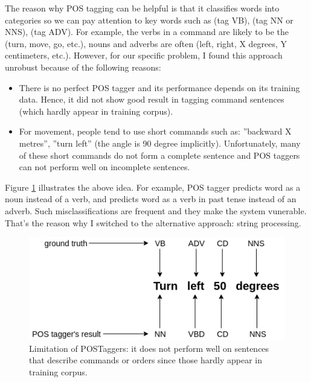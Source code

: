 The reason why POS tagging can be helpful is that it classifies words into categories so we can pay attention to key words such as  (tag VB),  (tag NN or NNS),  (tag ADV). For example, the verbs in a command are likely to be the  (turn, move, go, etc.), nouns and adverbs are often  (left, right, X degrees, Y centimeters, etc.). However, for our specific problem, I found this approach unrobust because of the following reasons:
\begin{itemize}
	\item There is no perfect POS tagger and its performance depends on its training data. Hence, it did not show good result in tagging command sentences (which hardly appear in training corpus).
	\item For movement, people tend to use short commands such as: ”backward X metres”, ”turn left” (the angle is 90 degree implicitly). Unfortunately, many of these short commands do not form a complete sentence and POS taggers can not perform well on incomplete sentences.
\end{itemize}
Figure \ref{fig:POSTagLimits} illustrates the above idea. For example, POS tagger predicts word  as a noun instead of a verb, and predicts word  as a verb in past tense instead of an adverb. Such misclassifications are frequent and they make the system vunerable. That's the reason why I switched to the alternative approach: string processing.

\begin{figure}[tb]
	\centering
	\includegraphics[width=0.7\hsize]{./figures/POSTagLimits}
	\caption{Limitation of POSTaggers: it does not perform well on sentences that describe commands or orders since those hardly appear in training corpus.}
	\label{fig:POSTagLimits}
\end{figure}

